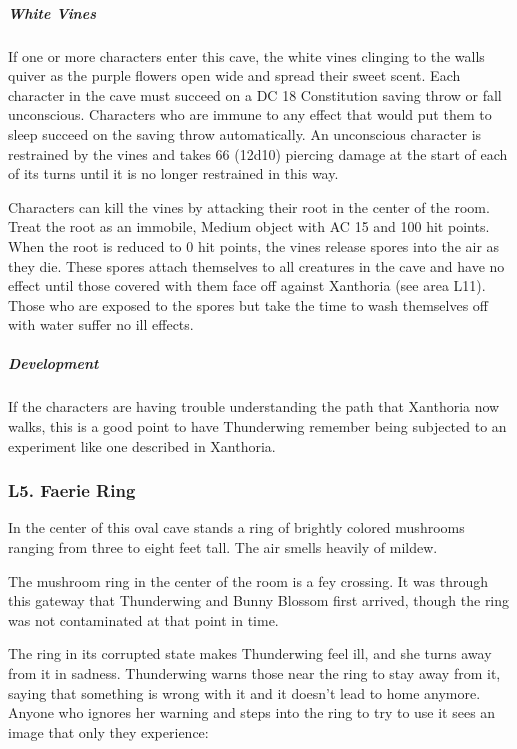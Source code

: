 \documentclass[10pt,a4paper,twoside,bg=print,twocolumn,openany,nodeprecatedcode]{dndbook}
\begin{document}
\subparagraph{White Vines}
If one or more characters enter this cave, the white vines clinging to the walls quiver as the purple flowers open wide and spread their sweet scent. Each character in the cave must succeed on a DC 18 Constitution saving throw or fall unconscious. Characters who are immune to any effect that would put them to sleep succeed on the saving throw automatically. An unconscious character is restrained by the vines and takes 66 (12d10) piercing damage at the start of each of its turns until it is no longer restrained in this way.

Characters can kill the vines by attacking their root in the center of the room. Treat the root as an immobile, Medium object with AC 15 and 100 hit points. When the root is reduced to 0 hit points, the vines release spores into the air as they die. These spores attach themselves to all creatures in the cave and have no effect until those covered with them face off against Xanthoria (see area L11). Those who are exposed to the spores but take the time to wash themselves off with water suffer no ill effects.

\subparagraph{Development}
If the characters are having trouble understanding the path that Xanthoria now walks, this is a good point to have Thunderwing remember being subjected to an experiment like one described in Xanthoria.

\subsubsection{L5. Faerie Ring}
\begin{DndReadAloud}{}
In the center of this oval cave stands a ring of brightly colored mushrooms ranging from three to eight feet tall. The air smells heavily of mildew.

\end{DndReadAloud}

The mushroom ring in the center of the room is a fey crossing. It was through this gateway that Thunderwing and Bunny Blossom first arrived, though the ring was not contaminated at that point in time.

The ring in its corrupted state makes Thunderwing feel ill, and she turns away from it in sadness. Thunderwing warns those near the ring to stay away from it, saying that something is wrong with it and it doesn't lead to home anymore. Anyone who ignores her warning and steps into the ring to try to use it sees an image that only they experience:
\end{document}
